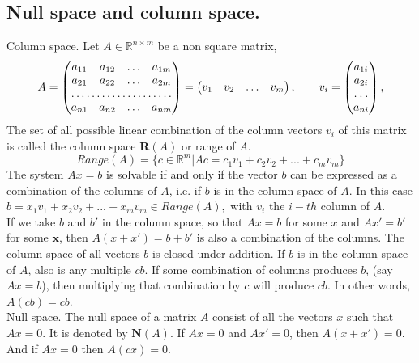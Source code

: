 \documentclass[12pt]{report}
\begin{document}
\subsection{Null space and column space.}
Column space. Let $A \in \mathbb{R}^{n \times m}$ be a non square matrix,
\begin{equation*}
A
=
\begin{pmatrix}
a_{11} & a_{12} & \dots & a_{1m}\\
a_{21} & a_{22} & \dots & a_{2m}\\
\hdotsfor{4}\\
a_{n1} & a_{n2} & \dots &a_{nm}
\end{pmatrix}
=\begin{pmatrix}
v_{1} & v_{2} & \dots & v_{m}\\
\end{pmatrix}, \qquad v_i=
\begin{pmatrix}
a_{1i} \\
a_{2i} \\
\hdotsfor{1}\\
a_{ni} 
\end{pmatrix},
\end{equation*}
The set of all possible linear combination of the column vectors $v_i$ 
of this matrix is called 
the column space $\mathbf{R}(A)$ or range of $A$.
$$
Range(A)=\{c\in\mathbb{R}^m|Ac=c_1v_1+c_2v_2+...+c_mv_m  \}
$$
The system $Ax=b$ is solvable if and only if the vector $b$ can be expressed as a
combination of the columns of $A$, i.e. if $b$ is in the column space of $A$. In this case
$b=x_1v_1+x_2v_2+...+x_mv_m \in Range(A),$ with $v_i$ the $i-th$ column of $A$.\\
If we take $b$ and $b'$ in the column space, so that $Ax=b$ for some $x$ and $Ax'=b'$ for
some $\mathbf{x}$, then $A(x+x')=b+b'$ is also a combination of the columns. The column space
of all vectors $b$ is closed under addition.
If $b$ is in the column space of $A$, also is any multiple $cb$. If some combination
of columns produces $b$, (say $Ax=b$), then multiplying that combination by $c$
will produce $cb$. In other words, $A(cb)=cb$.\\
Null space. The null space of a matrix $A$ consist of all the vectors $x$ such that 
$Ax=0$. It is denoted by $\mathbf{N}(A)$.
If $Ax=0$ and $Ax'=0$, then $A(x+x')=0$. And if $Ax=0$ then $A(cx)=0$.
\end{document}
